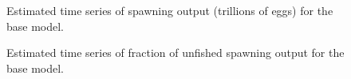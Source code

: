 \documentclass[
]{scrartcl}
\begin{document}
\begin{figure}[H]


\caption{\label{fig-es-sb}Estimated time series of spawning output
(trillions of eggs) for the base model.}

\end{figure}%

\begin{figure}[H]


\caption{\label{fig-es-depl}Estimated time series of fraction of
unfished spawning output for the base model.}

\end{figure}%
\end{document}
